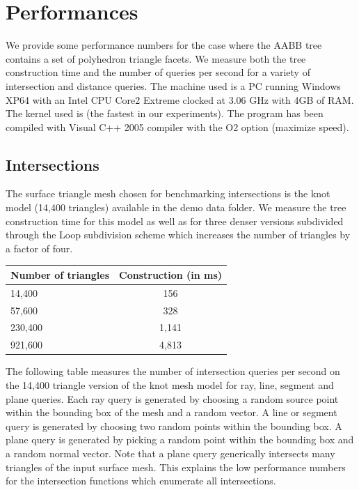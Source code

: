 \section{Performances}
\label{AABB_tree_section_performances}

We provide some performance numbers for the case where the AABB tree contains a set of polyhedron triangle facets. We measure both the tree construction time and the number of queries per second for a variety of intersection and distance queries. The machine used is a PC running Windows XP64 with an Intel CPU Core2 Extreme clocked at 3.06 GHz with 4GB of RAM. The kernel used is  (the fastest in our experiments). The program has been compiled with Visual C++ 2005 compiler with the O2 option (maximize speed).

\subsection{Intersections}

The surface triangle mesh chosen for benchmarking intersections is the knot model (14,400 triangles) available in the demo data folder. We measure the tree construction time for this model as well as for three denser versions subdivided through the Loop subdivision scheme which increases the number of triangles by a factor of four.

\begin{tabular}{|l|c|}
  \hline
  Number of triangles & Construction (in ms)\\
  \hline
   14,400 &   156 \\
   57,600 &   328 \\
  230,400 & 1,141 \\
  921,600 & 4,813 \\
  \hline
\end{tabular}

The following table measures the number of intersection queries per second on the 14,400 triangle version of the knot mesh model for ray, line, segment and plane queries. Each ray query is generated by choosing a random source point within the bounding box of the mesh and a random vector. A line or segment query is generated by choosing two random points within the bounding box. A plane query is generated by picking a random point within the bounding box and a random normal vector. Note that a plane query generically intersects many triangles of the input surface mesh. This explains the low performance numbers for the intersection functions which enumerate all intersections.

